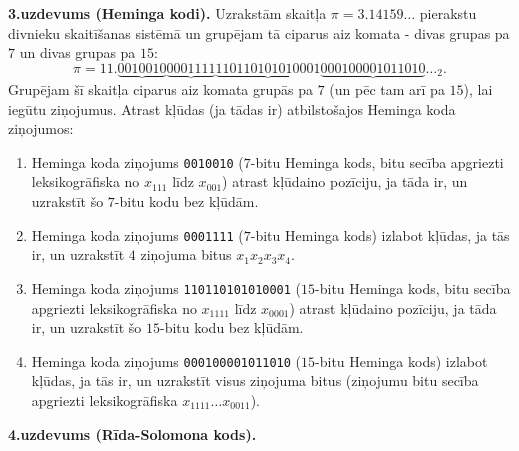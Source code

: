 \documentclass[a4paper,12pt]{article}
\begin{document}
\vspace{10pt}
{\bf 3.uzdevums (Heminga kodi).} 
Uzrakstām skaitļa $\pi = 3.14159\ldots$ pierakstu divnieku skaitīšanas sistēmā un 
grupējam tā ciparus aiz komata - divas grupas pa $7$ un divas grupas pa $15$:
$$\pi = 11.\underbrace{0010010}\underbrace{0001111}\underbrace{110110101010001}\underbrace{000100001011010}\ldots_2.$$
Grupējam šī skaitļa ciparus aiz komata grupās pa $7$ (un pēc tam arī pa
$15$), lai iegūtu ziņojumus. Atrast kļūdas (ja tādas ir) atbilstošajos Heminga koda ziņojumos:
\begin{enumerate}
\item Heminga koda ziņojums {\tt 0010010} ($7$-bitu Heminga kods, bitu secība apgriezti leksikogrāfiska
\textendash{} no $x_{111}$ līdz $x_{001}$) \textendash{} atrast kļūdaino pozīciju, ja tāda ir, un uzrakstīt šo $7$-bitu kodu bez kļūdām.
\item Heminga koda ziņojums {\tt 0001111} ($7$-bitu Heminga kods) \textendash{} izlabot kļūdas, ja tās ir, un uzrakstīt $4$ ziņojuma bitus $x_1x_2x_3x_4$. 
\item Heminga koda ziņojums {\tt 110110101010001} ($15$-bitu Heminga kods, bitu secība apgriezti leksikogrāfiska 
\textendash{} no $x_{1111}$ līdz $x_{0001}$) \textendash{} atrast kļūdaino pozīciju, ja tāda ir, un uzrakstīt šo $15$-bitu kodu bez kļūdām.
\item Heminga koda ziņojums {\tt 000100001011010} ($15$-bitu Heminga kods) \textendash{} 
izlabot kļūdas, ja tās ir, un uzrakstīt visus ziņojuma bitus (ziņojumu bitu secība apgriezti leksikogrāfiska $x_{1111}\ldots{}x_{0011}$).
\end{enumerate}



\vspace{10pt}
{\bf 4.uzdevums (Rīda-Solomona kods).}
\end{document}
